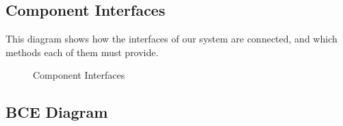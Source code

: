 \documentclass[english]{article}
\begin{document}
\newpage
\subsection{Component Interfaces}

This diagram shows how the interfaces of our system are connected, and which methods each of them must provide.

\begin{figure}[H]
	\centering
	\caption{Component Interfaces}
	\label{compinterfaces}
\end{figure}

\newpage
\subsection{BCE Diagram}
\end{document}
